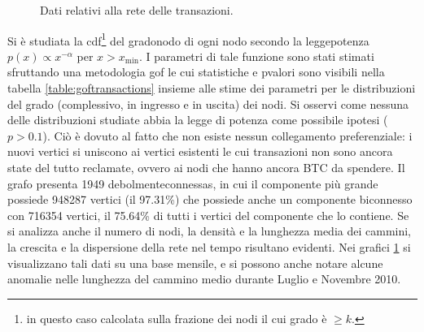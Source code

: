 \begin{figure}[htbp]
  \centering
  \hfill
  \par
  \par
  \hfill
  \hfill
  \caption[Transaction Network]{Dati relativi alla rete delle transazioni.\label{anonimity_1.3}}
\end{figure}

Si è studiata la \gls{cdf}\footnote{in questo caso calcolata sulla frazione dei nodi il cui grado è $\geq k$.} del \gls{gradonodo} di ogni nodo secondo la \gls{leggepotenza} $p(x)\propto x^{-\alpha}$ per $x > x_\text{min}$. I parametri di tale funzione sono stati stimati sfruttando una metodologia \gls{gof} le cui statistiche e \gls{pvalori} sono visibili nella tabella \ref{table:goftransactions} insieme alle stime dei parametri per le distribuzioni del grado (complessivo, in ingresso e in uscita) dei nodi. Si osservi come nessuna delle distribuzioni studiate abbia la legge di potenza come possibile ipotesi ($p > 0.1$). Ciò è dovuto al fatto che non esiste nessun collegamento preferenziale: i nuovi vertici si uniscono ai vertici esistenti le cui transazioni non sono ancora state del tutto reclamate, ovvero ai nodi che hanno ancora BTC da spendere.
Il grafo presenta 1949 \glspl{debolmenteconnessa}, in cui il componente più grande possiede 948287 vertici (il 97.31\%) che possiede anche un componente biconnesso con 716354 vertici, il 75.64\% di tutti i vertici del componente che lo contiene.
Se si analizza anche il numero di nodi, la densità e la lunghezza media dei cammini, la crescita e la dispersione della rete nel tempo risultano evidenti. Nei grafici \ref{anonimity_1.3} si visualizzano tali dati su una base mensile, e si possono anche notare alcune anomalie nelle lunghezza del cammino medio durante Luglio e Novembre 2010.

